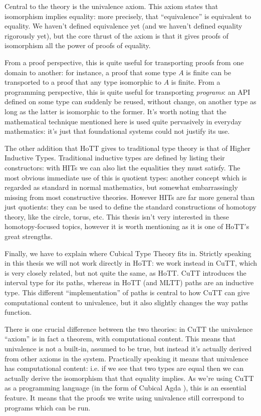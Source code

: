 Central to the theory is the univalence axiom.
This axiom states that isomorphism implies equality: more precisely, that
``equivalence'' is equivalent to equality.
We haven't defined equivalence yet (and we haven't defined equality rigorously
yet), but the core thrust of the axiom is that it gives proofs of isomorphism
all the power of proofs of equality.

From a proof perspective, this is quite useful for transporting proofs from one
domain to another: for instance, a proof that some type \(A\) is finite can be
transported to a proof that any type isomorphic to \(A\) is finite.
From a programming perspective, this is quite useful for transporting
\emph{programs}: an API defined on some type can suddenly be reused, without
change, on another type as long as the latter is isomorphic to the former.
It's worth noting that the mathematical technique mentioned here is used quite
pervasively in everyday mathematics: it's just that foundational systems could
not justify its use.

The other addition that HoTT gives to traditional type theory is that of Higher
Inductive Types.
Traditional inductive types are defined by listing their constructors: with HITs
we can also list the equalities they must satisfy.
The most obvious immediate use of this is quotient types: another concept which
is regarded as standard in normal mathematics, but somewhat embarrassingly
missing from most constructive theories.
However HITs are far more general than just quotients: they can be used to
define the standard constructions of homotopy theory, like the circle, torus,
etc.
This thesis isn't very interested in these homotopy-focused topics, however it
is worth mentioning as it is one of HoTT's great strengths.

Finally, we have to explain where Cubical Type Theory
\citep{cohenCubicalTypeTheory2016} fits in.
Strictly speaking in this thesis we will not work directly in HoTT: we work
instead in CuTT, which is very closely related, but not quite the same, as HoTT.
CuTT introduces the interval type for its paths, whereas in HoTT (and MLTT)
 paths are an inductive type.
This different ``implementation'' of paths is central to how CuTT can give
computational content to univalence, but it also slightly changes the way paths
function.


There is one crucial difference between the two theories: in CuTT the
univalence ``axiom'' is in fact a theorem, with computational content.
This means that univalence is not a built-in, assumed to be true, but instead
it's actually derived from other axioms in the system.
Practically speaking it means that univalence has computational content: i.e. if
we see that two types are equal then we can actually derive the isomorphism that
that equality implies.
As we're using CuTT as a programming language (in the form of Cubical Agda
\citep{vezzosiCubicalAgdaDependently2019}), this is an essential feature.
It means that the proofs we write using univalence still correspond to programs
which can be run.

